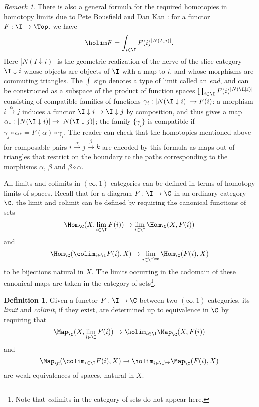 \documentclass[12pt]{amsart}
\theoremstyle{definition} \newtheorem{definition}[theorem]{Definition}
\theoremstyle{remark} \newtheorem{remark}[theorem]{Remark}
\numberwithin{equation}{section}
\newcommand{\oo}{\infty}
\newcommand{\io}{$(\oo,1)$}
\newcommand{\abs}[1]{\left|#1\right|}
\begin{document}
\begin{remark}
  There is also a general formula for the required homotopies in
  homotopy limits due to Pete Bousfield and Dan Kan
  \cite{BousfieldKan}: for a functor $F : \I \to \Top$, we have
  \[\holim F = \int_{i\in\I} F(i)^{\abs{N(I\downarrow i)}}.\] Here
  $\abs{N(I\downarrow i)}$ is the geometric realization of the nerve
  of the slice category $\I \downarrow i$ whose objects are objects of
  $\I$ with a map to $i$, and whose morphisms are commuting triangles.
  The $\int$ sign denotes a type of limit called an \emph{end}, and
  can be constructed as a subspace of the product of function spaces
  $\prod_{i \in \I} F(i)^{\abs{N(\I\downarrow i)}}$ consisting of
  compatible families of functions $\gamma_i :\abs{N(\I\downarrow i)}
  \to F(i)$: a morphism $i \xrightarrow{\alpha} j$ induces a functor
  $\I\downarrow i \to \I\downarrow j$ by composition, and thus gives a
  map $\alpha_* : \abs{N(\I\downarrow i)} \to \abs{N(\I\downarrow
    j)}$; the family $\{\gamma_i\}$ is compatible if $\gamma_j \circ
  \alpha_* = F(\alpha) \circ \gamma_i$. The reader can check that the
  homotopies mentioned above for composable pairs
  $i\xrightarrow{\alpha} j\xrightarrow{\beta} k$ are encoded by this
  formula as maps out of triangles that restrict on the boundary to
  the paths corresponding to the morphisms $\alpha$, $\beta$ and
  $\beta \circ \alpha$.
\end{remark}

All limits and colimits in \io-categories can be defined in terms of
homotopy limits of spaces. Recall that for a diagram $F : \I \to \C$
in an ordinary category $\C$, the limit and colimit can be defined by
requiring the canonical functions of sets
\[\Hom_\C(X,\lim_{i\in\I} F(i)) \to \lim_{i\in\I} \Hom_\C(X,F(i))\] and
\[\Hom_\C(\colim_{i\in\I} F(i),X) \to \lim_{i\in\I^{\op}}
  \Hom_\C(F(i),X)\]
to be bijections natural in $X$. The limits occurring in the codomain
of these canonical maps are taken in the category of
sets\footnote{Note that \emph{co}limits in the category of sets do not
  appear here.}.

\begin{definition}
  Given a functor $F : \I \to \C$ between two \io-categories, its
  \emph{limit} and \emph{colimit}, if they exist, are determined
  up to equivalence in $\C$ by requiring that
  \[\Map_\C(X,\lim_{i\in\I} F(i)) \to \holim_{i\in\I} \Map_\C(X,F(i))\] and
  \[\Map_\C(\colim_{i\in\I} F(i),X) \to \holim_{i\in\I^{\op}} \Map_\C(F(i),X)\]
  are weak equivalences of spaces, natural in $X$.
\end{definition}
\end{document}
